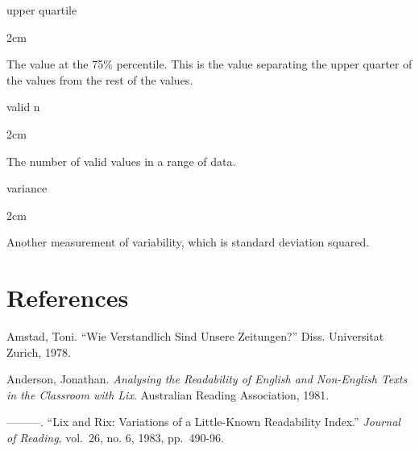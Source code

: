 \documentclass[
]{book}
\newenvironment{glsentry}
  {
  \begin{minipage}{\textwidth}
  }
  {
  \end{minipage}
  }
\newenvironment{glsterm}
  {
  \bfseries
  }
  {
  }
\newenvironment{glsdef}
  {
  \noindent
  \flushleft
  \begin{adjustwidth}{2cm}{}
  }
  {
  \end{adjustwidth}
  }
\theoremstyle{definition}
\theoremstyle{definition}
\theoremstyle{definition}
\theoremstyle{definition}
\theoremstyle{remark}
\begin{document}
\begin{glsentry}

\begin{glsterm}
upper quartile

\end{glsterm}

\begin{glsdef}
The value at the 75\% percentile. This is the value separating the upper quarter of the values from the rest of the values.

\end{glsdef}

\end{glsentry}

\begin{glsentry}

\begin{glsterm}
valid n

\end{glsterm}

\begin{glsdef}
The number of valid values in a range of data.

\end{glsdef}

\end{glsentry}

\begin{glsentry}

\begin{glsterm}
variance

\end{glsterm}

\begin{glsdef}
Another measurement of variability, which is standard deviation squared.

\end{glsdef}

\end{glsentry}

\hypertarget{bibliography}{%
\chapter{References}\label{bibliography}}

Amstad, Toni. ``Wie Verstandlich Sind Unsere Zeitungen?'' Diss. Universitat Zurich, 1978.

Anderson, Jonathan. \emph{Analysing the Readability of English and Non-English Texts in the Classroom with Lix}. Australian Reading Association, 1981.

---------. ``Lix and Rix: Variations of a Little-Known Readability Index.'' \emph{Journal of Reading}, vol.~26, no. 6, 1983, pp.~490-96.
\end{document}
